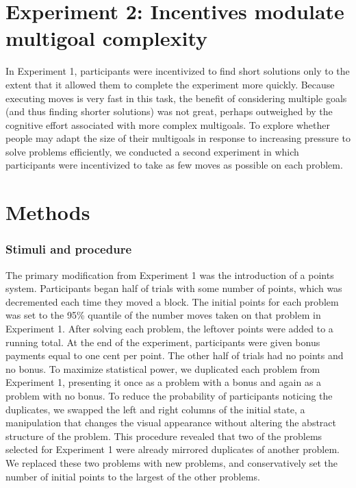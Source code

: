 \documentclass[10pt,letterpaper]{article}
\begin{document}



\section{Experiment 2: Incentives modulate multigoal complexity}
In Experiment 1, participants were incentivized to find short solutions only to the extent that it allowed them to complete the experiment more quickly. Because executing moves is very fast in this task, the benefit of considering multiple goals (and thus finding shorter solutions) was not great, perhaps outweighed by the cognitive effort associated with more complex multigoals. To explore whether people may adapt the size of their multigoals in response to increasing pressure to solve problems efficiently, we conducted a second experiment in which participants were incentivized to take as few moves as possible on each problem.

\section{Methods}
\subsubsection{Stimuli and procedure}
The primary modification from Experiment 1 was the introduction of a points system. Participants began half of trials with some number of points, which was decremented each time they moved a block. The initial points for each problem was set to the 95\% quantile of the number moves taken on that problem in Experiment 1. After solving each problem, the leftover points were added to a running total. At the end of the experiment, participants were given bonus payments equal to one cent per point. The other half of trials had no points and no bonus. To maximize statistical power, we duplicated each problem from Experiment 1, presenting it once as a problem with a bonus and again as a problem with no bonus. To reduce the probability of participants noticing the duplicates, we swapped the left and right columns of the initial state, a manipulation that changes the visual appearance without altering the abstract structure of the problem. This procedure revealed that two of the problems selected for Experiment 1 were already mirrored duplicates of another problem. We replaced these two problems with new problems, and conservatively set the number of initial points to the largest of the other problems.
\end{document}
